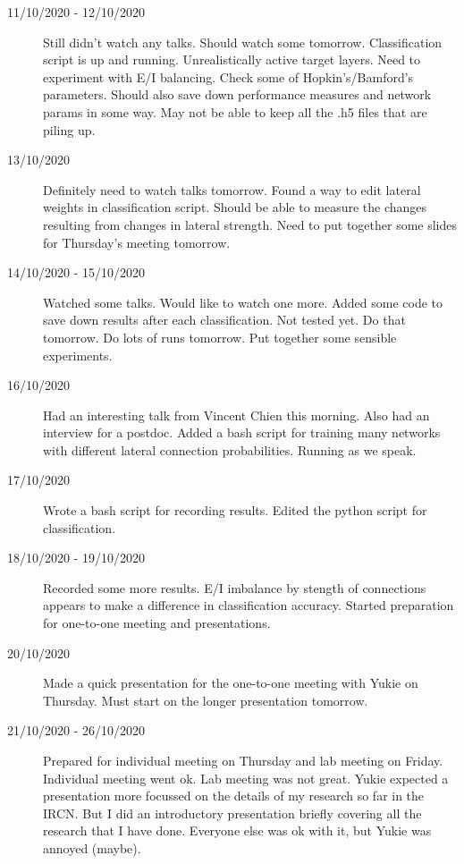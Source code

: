 \documentclass[a4paper,12pt]{article}
\theoremstyle{definition}
\begin{document}
\begin{description}
	\item[11/10/2020 - 12/10/2020] Still didn't watch any talks. Should watch some tomorrow. Classification script is up and running. Unrealistically active target layers. Need to experiment with E/I balancing. Check some of Hopkin's/Bamford's parameters. Should also save down performance measures and network params in some way. May not be able to keep all the .h5 files that are piling up.

	\item[13/10/2020] Definitely need to watch talks tomorrow. Found a way to edit lateral weights in classification script. Should be able to measure the changes resulting from changes in lateral strength. Need to put together some slides for Thursday's meeting tomorrow.

	\item[14/10/2020 - 15/10/2020] Watched some talks. Would like to watch one more. Added some code to save down results after each classification. Not tested yet. Do that tomorrow. Do lots of runs tomorrow. Put together some sensible experiments.

	\item[16/10/2020] Had an interesting talk from Vincent Chien this morning. Also had an interview for a postdoc. Added a bash script for training many networks with different lateral connection probabilities. Running as we speak.

	\item[17/10/2020] Wrote a bash script for recording results. Edited the python script for classification.

	\item[18/10/2020 - 19/10/2020] Recorded some more results. E/I imbalance by stength of connections appears to make a difference in classification accuracy. Started preparation for one-to-one meeting and presentations.

	\item[20/10/2020] Made a quick presentation for the one-to-one meeting with Yukie on Thursday. Must start on the longer presentation tomorrow.

  \item[21/10/2020 - 26/10/2020] Prepared for individual meeting on Thursday and lab meeting on Friday. Individual meeting went ok. Lab meeting was not great. Yukie expected a presentation more focussed on the details of my research so far in the IRCN. But I did an introductory presentation briefly covering all the research that I have done. Everyone else was ok with it, but Yukie was annoyed (maybe).


\end{description}
\end{document}
